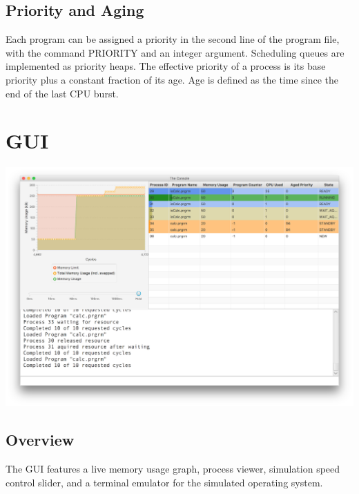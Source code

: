 \documentclass[paper=a4, fontsize=11pt]{scrartcl} %
\numberwithin{equation}{section} %
\numberwithin{figure}{section} %
\numberwithin{table}{section} %
\begin{document}
\subsection{Priority and Aging}
Each program can be assigned a priority in the second line of the program file, with the command PRIORITY and an integer argument. Scheduling queues are implemented as priority heaps. The effective priority of a process is its base priority plus a constant fraction of its age. Age is defined as the time since the end of the last CPU burst.

\section{GUI}
\includegraphics[width=\textwidth]{Demo.png}
\subsection{Overview}
The GUI features a live memory usage graph, process viewer, simulation speed control slider, and a terminal emulator for the simulated operating system. 
\end{document}
